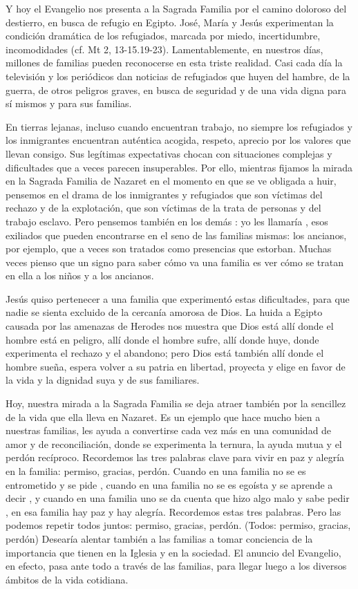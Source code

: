 Y hoy el Evangelio nos presenta a la Sagrada Familia por el camino doloroso del destierro, en busca de refugio en Egipto. José, María y Jesús experimentan la condición dramática de los refugiados, marcada por miedo, incertidumbre, incomodidades (cf. Mt 2, 13-15.19-23). Lamentablemente, en nuestros días, millones de familias pueden reconocerse en esta triste realidad. Casi cada día la televisión y los periódicos dan noticias de refugiados que huyen del hambre, de la guerra, de otros peligros graves, en busca de seguridad y de una vida digna para sí mismos y para sus familias.

En tierras lejanas, incluso cuando encuentran trabajo, no siempre los refugiados y los inmigrantes encuentran auténtica acogida, respeto, aprecio por los valores que llevan consigo. Sus legítimas expectativas chocan con situaciones complejas y dificultades que a veces parecen insuperables. Por ello, mientras fijamos la mirada en la Sagrada Familia de Nazaret en el momento en que se ve obligada a huir, pensemos en el drama de los inmigrantes y refugiados que son víctimas del rechazo y de la explotación, que son víctimas de la trata de personas y del trabajo esclavo. Pero pensemos también en los demás : yo les llamaría , esos exiliados que pueden encontrarse en el seno de las familias mismas: los ancianos, por ejemplo, que a veces son tratados como presencias que estorban. Muchas veces pienso que un signo para saber cómo va una familia es ver cómo se tratan en ella a los niños y a los ancianos.

Jesús quiso pertenecer a una familia que experimentó estas dificultades, para que nadie se sienta excluido de la cercanía amorosa de Dios. La huida a Egipto causada por las amenazas de Herodes nos muestra que Dios está allí donde el hombre está en peligro, allí donde el hombre sufre, allí donde huye, donde experimenta el rechazo y el abandono; pero Dios está también allí donde el hombre sueña, espera volver a su patria en libertad, proyecta y elige en favor de la vida y la dignidad suya y de sus familiares.

Hoy, nuestra mirada a la Sagrada Familia se deja atraer también por la sencillez de la vida que ella lleva en Nazaret. Es un ejemplo que hace mucho bien a nuestras familias, les ayuda a convertirse cada vez más en una comunidad de amor y de reconciliación, donde se experimenta la ternura, la ayuda mutua y el perdón recíproco. Recordemos las tres palabras clave para vivir en paz y alegría en la familia: permiso, gracias, perdón. Cuando en una familia no se es entrometido y se pide , cuando en una familia no se es egoísta y se aprende a decir , y cuando en una familia uno se da cuenta que hizo algo malo y sabe pedir , en esa familia hay paz y hay alegría. Recordemos estas tres palabras. Pero las podemos repetir todos juntos: permiso, gracias, perdón. (Todos: permiso, gracias, perdón) Desearía alentar también a las familias a tomar conciencia de la importancia que tienen en la Iglesia y en la sociedad. El anuncio del Evangelio, en efecto, pasa ante todo a través de las familias, para llegar luego a los diversos ámbitos de la vida cotidiana.

